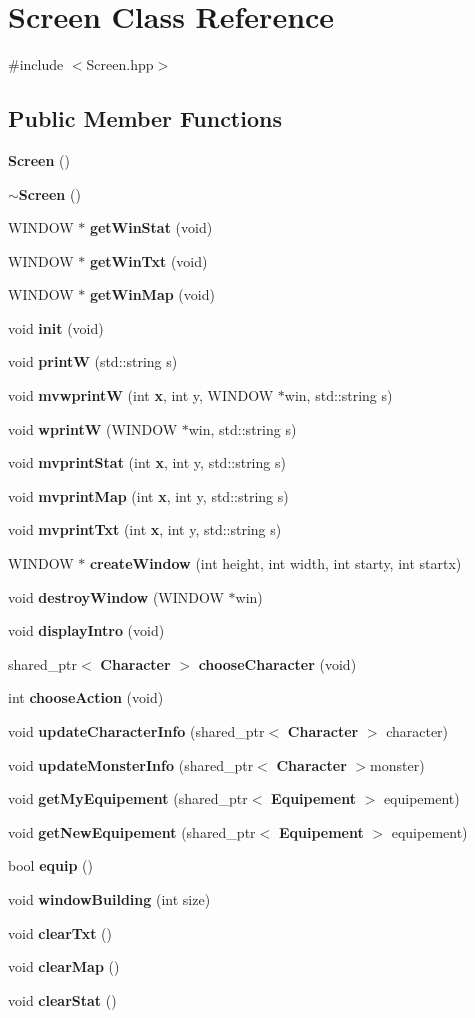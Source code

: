 \section{Screen Class Reference}
\label{class_screen}


{\ttfamily \#include $<$Screen.\-hpp$>$}

\subsection*{Public Member Functions}
\begin{DoxyCompactItemize}
\item 
{\bf Screen} ()
\item 
{\bf $\sim$\-Screen} ()
\item 
W\-I\-N\-D\-O\-W $\ast$ {\bf get\-Win\-Stat} (void)
\item 
W\-I\-N\-D\-O\-W $\ast$ {\bf get\-Win\-Txt} (void)
\item 
W\-I\-N\-D\-O\-W $\ast$ {\bf get\-Win\-Map} (void)
\item 
void {\bf init} (void)
\item 
void {\bf print\-W} (std\-::string s)
\item 
void {\bf mvwprint\-W} (int {\bf x}, int y, W\-I\-N\-D\-O\-W $\ast$win, std\-::string s)
\item 
void {\bf wprint\-W} (W\-I\-N\-D\-O\-W $\ast$win, std\-::string s)
\item 
void {\bf mvprint\-Stat} (int {\bf x}, int y, std\-::string s)
\item 
void {\bf mvprint\-Map} (int {\bf x}, int y, std\-::string s)
\item 
void {\bf mvprint\-Txt} (int {\bf x}, int y, std\-::string s)
\item 
W\-I\-N\-D\-O\-W $\ast$ {\bf create\-Window} (int height, int width, int starty, int startx)
\item 
void {\bf destroy\-Window} (W\-I\-N\-D\-O\-W $\ast$win)
\item 
void {\bf display\-Intro} (void)
\item 
shared\-\_\-ptr$<$ {\bf Character} $>$ {\bf choose\-Character} (void)
\item 
int {\bf choose\-Action} (void)
\item 
void {\bf update\-Character\-Info} (shared\-\_\-ptr$<$ {\bf Character} $>$ character)
\item 
void {\bf update\-Monster\-Info} (shared\-\_\-ptr$<$ {\bf Character} $>$monster)
\item 
void {\bf get\-My\-Equipement} (shared\-\_\-ptr$<$ {\bf Equipement} $>$ equipement)
\item 
void {\bf get\-New\-Equipement} (shared\-\_\-ptr$<$ {\bf Equipement} $>$ equipement)
\item 
bool {\bf equip} ()
\item 
void {\bf window\-Building} (int size)
\item 
void {\bf clear\-Txt} ()
\item 
void {\bf clear\-Map} ()
\item 
void {\bf clear\-Stat} ()
\end{DoxyCompactItemize}


